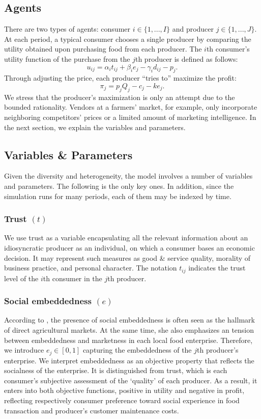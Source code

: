\documentclass[11pt, oneside]{article}
\begin{document}
\subsection{Agents}
There are two types of agents: consumer $i \in \{1,...,I\}$ and producer $j \in \{1,...,J\}$. At each period, a typical consumer chooses a single producer by comparing the utility obtained upon purchasing food from each producer. The $i$th consumer's utility function of the purchase from the $j$th producer is defined as follows:
\begin{equation} \label{util}
  u_{ij} = \alpha_i t_{ij} + \beta_i e_j - \gamma_i d_{ij} - p_j .
\end{equation}
Through adjusting the price, each producer ``tries to'' maximize the profit:
\begin{equation}  \label{profit}
  \pi_j = p_j Q_j - c_j - k e_j .
\end{equation}
We stress that the producer's maximization is only an attempt due to the bounded rationality. Vendors at a farmers' market, for example, only incorporate neighboring competitors' prices or a limited amount of marketing intelligence. In the next section, we explain the variables and parameters.

\subsection{Variables \& Parameters}
Given the diversity and heterogeneity, the model involves a number of variables and parameters. The following is the only key ones. In addition, since the simulation runs for many periods, each of them may be indexed by time.

\subsubsection{Trust $(t)$}
We use trust as a variable encapsulating all the relevant information about an idiosyncratic producer as an individual, on which a consumer bases an economic decision. It may represent such measures as good \& service quality, morality of business practice, and personal character. The notation $t_{ij}$ indicates the trust level of the $i$th consumer in the $j$th producer.

\subsubsection{Social embeddedness $(e)$}
According to \textcite{Hinrichs2000}, the presence of social embeddedness is often seen as the hallmark of direct agricultural markets. At the same time, she also emphasizes an tension between embeddedness and marketness in each local food enterprise. Therefore, we introduce $e_j \in [0,1]$ capturing the embeddedness of the $j$th producer's enterprise. We interpret embeddedness as an objective property that reflects the socialness of the enterprise. It is distinguished from trust, which is each consumer's subjective assessment of the `quality' of each producer. As a result, it enters into both objective functions, positive in utility and negative in profit, reflecting respectively consumer preference toward social experience in food transaction and producer's customer maintenance costs.
\end{document}
